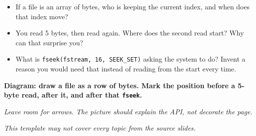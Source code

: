 \documentclass[12pt]{article}
\begin{document}
\begin{itemize}
  \item If a file is an array of bytes, who is keeping the current index, and when does that index move?
  \vspace{2.2em}
  \item You read 5 bytes, then read again. Where does the second read start? Why can that surprise you?
  \vspace{2.2em}
  \item What is \texttt{fseek(fstream, 16, SEEK\_SET)} asking the system to do? Invent a reason you would need that instead of reading from the start every time.
  \vspace{2.4em}
\end{itemize}

\noindent\textbf{Diagram: draw a file as a row of bytes. Mark the position before a 5-byte read, after it, and after that \texttt{fseek}.}
\begin{framed}
\begin{minipage}[t][0.35\textheight]{\textwidth}
\vspace{0.6em}
\textit{Leave room for arrows. The picture should explain the API, not decorate the page.}
\end{minipage}
\end{framed}

\vspace{2.2em}
\begin{center}
\textit{This template may not cover every topic from the source slides.}
\end{center}
\end{document}
